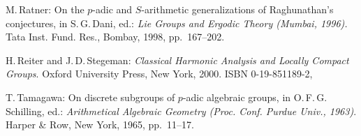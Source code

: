\begin{references}{99}
M.\,Ratner:
On the $p$-adic and $S$-arithmetic generalizations of Raghunathan's conjectures,
in S.\,G.\,Dani, ed.:
\emph{Lie Groups and Ergodic Theory (Mumbai, 1996).}
Tata Inst. Fund. Res., Bombay, 1998, pp.~167--202.

H.\,Reiter and J.\,D.\,Stegeman:
\emph{Classical Harmonic Analysis and Locally Compact Groups}.
Oxford University Press, New York, 2000. 
ISBN 0-19-851189-2,

T.\,Tamagawa:
On discrete subgroups of $p$-adic algebraic groups,
in O.\,F.\,G.\,Schilling, ed.:
\emph{Arithmetical Algebraic Geometry (Proc. Conf. Purdue Univ., 1963)}.
Harper \& Row, New York, 1965, pp.~11--17.

\end{references}
